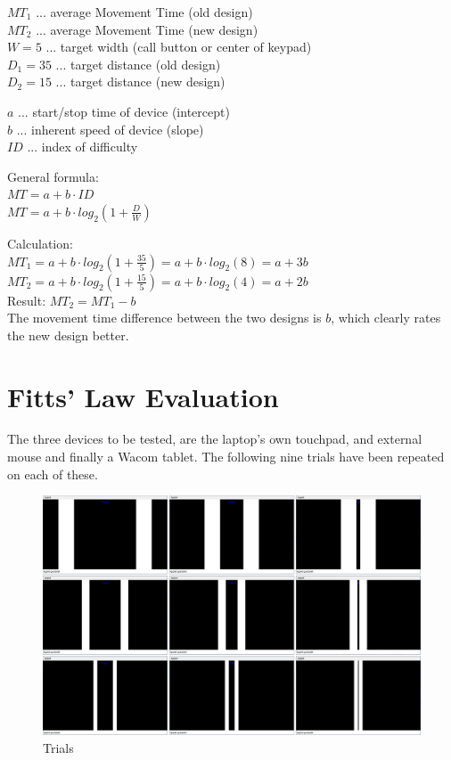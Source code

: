 \documentclass[a4paper,twoside,10pt]{article}
\begin{document}
$MT_1$ ... average Movement Time (old design) \\
$MT_2$ ... average Movement Time (new design) \\
$W = 5$ ... target width (call button or center of keypad) \\
$D_1 = 35$ ...  target distance (old design) \\
$D_2 = 15$ ... target distance (new design) 

$a$ ... start/stop time of device (intercept) \\
$b$ ... inherent speed of device (slope) \\
$ID$ ... index of difficulty

General formula: \\
$MT = a + b \cdot ID$ \\
$MT = a + b \cdot log_2 (1 + \frac{D}{W})$ 

Calculation: \\
$MT_1 = a + b \cdot log_2 (1 + \frac{35}{5}) = a + b \cdot log_2(8) = a + 3b$ \\
$MT_2 = a + b \cdot log_2 (1 + \frac{15}{5}) = a + b \cdot log_2(4) = a + 2b$ \\
Result: $MT_2 = MT_1 - b$ \\
The movement time difference between the two designs is $b$, which clearly rates the new design better.

\section{Fitts' Law Evaluation}
The three devices to be tested, are the laptop's own touchpad, and external mouse and finally a Wacom tablet. The following nine trials have been repeated on each of these.

\begin{figure}[ht]
	\centering
		\includegraphics[width=1.00\textwidth]{screenshots.pdf}
	\caption{Trials}
	\label{fig:screenshots}
\end{figure}
\end{document}
